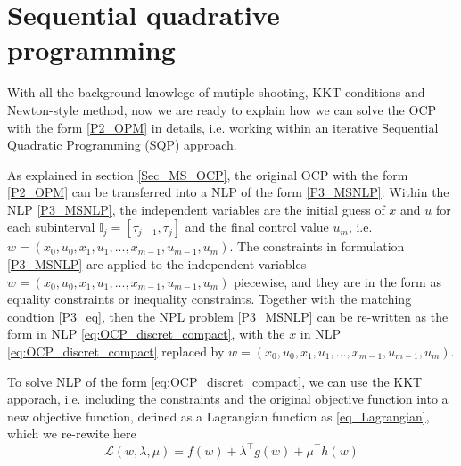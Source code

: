 \documentclass  [
  paper    = a4,
  BCOR     = 10mm,
  twoside,
  fontsize = 12pt,
  fleqn,
  toc      = bibnumbered,
  toc      = listofnumbered,
  numbers  = noendperiod,
  headings = normal,
  listof   = leveldown,
  version  = 3.03
]                                       {scrreprt}
\newcommand{\<}{\langle}
\renewcommand{\>}{\rangle}
\begin{document}
\section{Sequential quadrative programming}
With all the background knowlege of mutiple shooting, KKT conditions and Newton-style method, now we are ready to explain how we can solve the OCP with the form \ref{P2_OPM} in details, i.e. working within an iterative Sequential Quadratic Programming (SQP) approach. 

As explained in section \ref{Sec_MS_OCP}, the original OCP with the form \ref{P2_OPM} can be transferred into a NLP of the form \ref{P3_MSNLP}. Within the NLP  \ref{P3_MSNLP}, the independent variables are the initial guess of $x$ and $u$ for each subinterval $\mathbb{I}_j = [\tau_{j-1}, \tau_j]$ and the final control value $u_m$, i.e. $w = (x_0, u_0, x_1, u_1, ..., x_{m-1}, u_{m-1}, u_m)$. The constraints in formulation \ref{P3_MSNLP} are applied to the independent variables  $w = (x_0, u_0, x_1, u_1, ..., x_{m-1}, u_{m-1}, u_m)$ piecewise, and they are  in the form as equality constraints or inequality constraints. Together with the matching condtion \ref{P3_eq}, then the NPL problem  \ref{P3_MSNLP} can be re-written as the form in NLP \ref{eq:OCP_discret_compact}, with the $x$ in NLP \ref{eq:OCP_discret_compact} replaced by $w = (x_0, u_0, x_1, u_1, ..., x_{m-1}, u_{m-1}, u_m)$. 



To solve NLP of the form  \ref{eq:OCP_discret_compact}, we can use the KKT apporach, i.e. including the constraints and the original objective function into a new objective function, defined as a Lagrangian function as \ref{eq_Lagrangian}, which we re-rewite here 
\begin{equation}
	\mathcal{L}(w,\lambda, \mu) = f(w) + \lambda^\top g(w) +  \mu^\top h(w) 
\end{equation}
\end{document}
